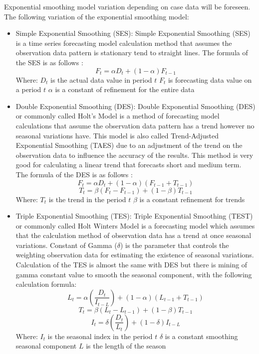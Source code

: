 \documentclass[conference]{IEEEtran}
\begin{document}
Exponential smoothing model variation depending on case data will be foreseen. The following variation of the exponential smoothing model:

\begin{itemize}
    \item Simple Exponential Smoothing (SES): Simple Exponential Smoothing (SES) is a time series forecasting model calculation method that assumes the observation data pattern is stationary tend to straight lines. The formula of the SES is as follows \cite{b2}:
    \[ F_t = \alpha D_t + (1 - \alpha) F_{t-1} \]
    Where:
    \( D_t \) is the actual data value in period \( t \)
    \( F_t \) is forecasting data value on a period \( t \)
    \( \alpha \) is a constant of refinement for the entire data
    
    \item Double Exponential Smoothing (DES): Double Exponential Smoothing (DES) or commonly called Holt's Model is a method of forecasting model calculations that assume the observation data pattern has a trend however no seasonal variations have. This model is also called Trend-Adjusted Exponential Smoothing (TAES) due to an adjustment of the trend on the observation data to influence the accuracy of the results. This method is very good for calculating a linear trend that forecasts short and medium term. The formula of the DES is as follows \cite{b3}:
    \[ F_t = \alpha D_t + (1 - \alpha)(F_{t-1} + T_{t-1}) \]
    \[ T_t = \beta (F_t - F_{t-1}) + (1 - \beta)T_{t-1} \]
    Where:
    \( T_t \) is the trend in the period \( t \)
    \( \beta \) is a constant refinement for trends
    
    \item Triple Exponential Smoothing (TES): Triple Exponential Smoothing (TEST) or commonly called Holt Winters Model is a forecasting model which assumes that the calculation method of observation data has a trend at once seasonal variations. Constant of Gamma (\( \delta \)) is the parameter that controls the weighting observation data for estimating the existence of seasonal variations. Calculation of the TES is almost the same with DES but there is mining of gamma constant value to smooth the seasonal component, with the following calculation formula:
    \[ L_{t} = \alpha \left( \frac{D_{t}}{I_{t-L}} \right) + (1 - \alpha)(L_{t-1} + T_{t-1}) \]
    \[ T_{t} = \beta (L_{t} - L_{t-1}) + (1 - \beta)T_{t-1} \]
    \[ I_{t} = \delta \left( \frac{D_{t}}{L_{t}} \right) + (1 - \delta)I_{t-L} \]
    Where:
    \( I_t \) is the seasonal index in the period \( t \)
    \( \delta \) is a constant smoothing seasonal component
    \( L \) is the length of the season
    
\end{itemize}
\end{document}
